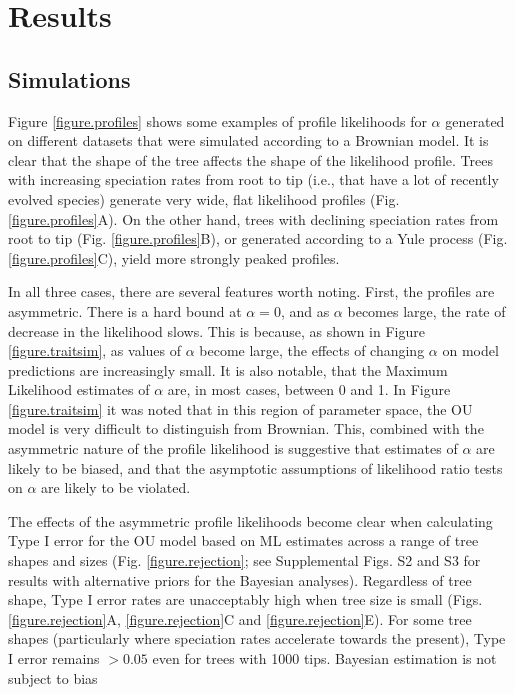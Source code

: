 \documentclass[a4paper,12pt]{article}
\begin{document}
\section{Results}
  \subsection{Simulations}
  \label{section:sims.results}
    
    Figure \ref{figure.profiles} shows some examples of profile likelihoods for $\alpha$ generated on different datasets that were simulated according to a Brownian model. It is clear that the shape of the tree affects the shape of the likelihood profile. Trees with increasing speciation rates from root to tip (i.e., that have a lot of recently evolved species) generate very wide, flat likelihood profiles (Fig. \ref{figure.profiles}A). On the other hand, trees with declining speciation rates from root to tip (Fig. \ref{figure.profiles}B), or generated according to a Yule process (Fig. \ref{figure.profiles}C), yield more strongly peaked profiles. 


In all three cases, there are several features worth noting. First, the profiles are asymmetric. There is a hard bound at $\alpha = 0$, and as $\alpha$ becomes large, the rate of decrease in the likelihood slows. This is because, as shown in Figure \ref{figure.traitsim}, as values of $\alpha$ become large, the effects of changing $\alpha$ on model predictions are increasingly small. It is also notable, that the Maximum Likelihood estimates of $\alpha$ are, in most cases, between 0 and 1. In Figure \ref{figure.traitsim} it was noted that in this region of parameter space, the OU model is very difficult to distinguish from Brownian. This, combined with the asymmetric nature of the profile likelihood is suggestive that estimates of $\alpha$ are likely to be biased, and that the asymptotic assumptions of likelihood ratio tests on $\alpha$ are likely to be violated.

The effects of the asymmetric profile likelihoods become clear when calculating Type I error for the OU model based on ML estimates across a range of tree shapes and sizes (Fig. \ref{figure.rejection}; see Supplemental Figs. S2 and S3 for results with alternative priors for the Bayesian analyses). Regardless of tree shape, Type I error rates are unacceptably high when tree size is small (Figs. \ref{figure.rejection}A, \ref{figure.rejection}C and \ref{figure.rejection}E). For some tree shapes (particularly where speciation rates accelerate towards the present), Type I error remains $>0.05$ even for trees with 1000 tips. Bayesian estimation is not subject to bias %
\end{document}
